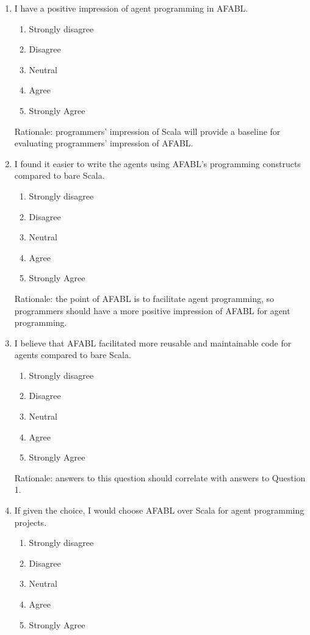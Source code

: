 \begin{enumerate}
\item I have a positive impression of agent programming in AFABL.

\begin{enumerate}
\item Strongly disagree
\item Disagree
\item Neutral
\item Agree
\item Strongly Agree
\end{enumerate}

Rationale: programmers’ impression of Scala will provide a baseline for evaluating
programmers’ impression of AFABL.

\item I found it easier to write the agents using AFABL’s programming constructs compared to bare Scala.

\begin{enumerate}
\item Strongly disagree
\item Disagree
\item Neutral
\item Agree
\item Strongly Agree
\end{enumerate}

Rationale: the point of AFABL is to facilitate agent programming, so programmers should have a more positive impression of AFABL for agent programming.

\item I believe that AFABL facilitated more reusable and maintainable code for agents compared to bare Scala.

\begin{enumerate}
\item Strongly disagree
\item Disagree
\item Neutral
\item Agree
\item Strongly Agree
\end{enumerate}

Rationale: answers to this question should correlate with answers to Question 1.

\item If given the choice, I would choose AFABL over Scala for agent programming projects.

\begin{enumerate}
\item Strongly disagree
\item Disagree
\item Neutral
\item Agree
\item Strongly Agree
\end{enumerate}


\end{enumerate}
